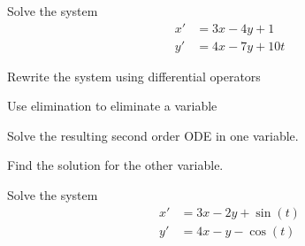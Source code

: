 \begin{applicationActivities}

\begin{activity}{20}
Solve the system
\begin{alignat*}{2}
x'&=3x-4y+1\\
y'&= 4x-7y+10t
\end{alignat*}
\begin{subactivity}
Rewrite the system using differential operators
\end{subactivity}
\begin{subactivity}
Use elimination to eliminate a variable
\end{subactivity}
\begin{subactivity}
Solve the resulting second order ODE in one variable.
\end{subactivity}
\begin{subactivity}
Find the solution for the other variable.
\end{subactivity}
\end{activity}

\begin{activity}{10}
Solve the system
\begin{alignat*}{2}
x'&=3x-2y+\sin(t)\\
y'&= 4x-y-\cos(t)
\end{alignat*}
\end{activity}

\end{applicationActivities}
